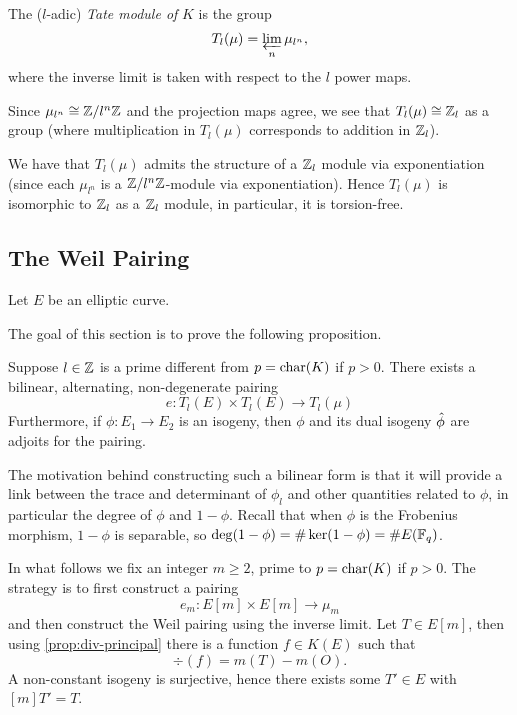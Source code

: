 
\begin{definition}
	The ($l$-adic) \emph{Tate module of} $K$ is the group
	\begin{equation*}
		T_l(\mu) = \varprojlim_n \mu_{l^n},
	\end{equation*}
	where the inverse limit is taken with respect to the $l$
	power maps.
\end{definition}

Since $\mu_{l^n} \cong \mathbb{Z}/l^n\mathbb{Z}$ and the projection maps agree,
we see that $T_l(\mu) \cong \mathbb{Z}_l$
as a group (where multiplication in $T_l(\mu)$ corresponds to addition in
$\mathbb{Z}_l$).

We have that $T_l(\mu)$ admits the structure of a $\mathbb{Z}_l$ module
via exponentiation (since
each $\mu_{l^n}$ is a $\mathbb{Z}/l^n\mathbb{Z}$-module via exponentiation).
Hence $T_l(\mu)$ is isomorphic to $\mathbb{Z}_l$ as a $\mathbb{Z}_l$ module,
in particular, it is torsion-free.

\subsection{The Weil Pairing}

Let $E$ be an elliptic curve. 


The goal of this section is to prove the following proposition.
\begin{proposition}
	\label{prop:weil-pairing}
	Suppose $l \in \mathbb{Z}$ is a prime different from $p = \operatorname{char}(K)$ if $p > 0$.
	There exists a bilinear, alternating, non-degenerate pairing
	\begin{equation*}
		e: T_l(E) \times T_l(E) \to T_l(\mu)	
	\end{equation*}
	Furthermore, if $\phi: E_1 \to E_2$ is an isogeny, then $\phi$ and its
	dual isogeny $\Hat\phi$ are adjoits for the pairing.
\end{proposition}
The motivation behind constructing such a bilinear form is that it will provide
a link between the trace and determinant of $\phi_l$ and other quantities
related to $\phi$, in particular the degree of $\phi$ and $1 - \phi$.
Recall that when $\phi$ is the Frobenius morphism, $1 - \phi$ is separable,
so $\deg(1 - \phi) = \#\ker(1 - \phi) = \#E(\mathbb{F}_q)$.

In what follows we fix an integer $m \geq 2$,
prime to $p = \operatorname{char}(K)$ if $p > 0$.
The strategy is to first construct a pairing
\begin{equation*}
	e_m: E[m] \times E[m] \to \mu_m
\end{equation*}
and then construct the Weil pairing using the inverse limit.
Let $T \in E[m]$, then using \ref{prop:div-principal}
there is a function $f \in K(E)$ such that
\begin{equation*}
	\div(f) = m(T) - m(O).
\end{equation*}
A non-constant isogeny is surjective, hence there exists some $T' \in E$
with $[m]T' = T$. 

